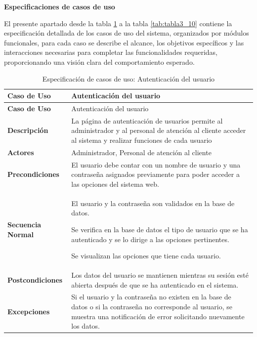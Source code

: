 	\noindent \textbf{Especificaciones de casos de uso}
	
	El presente apartado desde la tabla \ref{tab:tabla3_2} a la tabla \ref{tab:tabla3_10} contiene la especificación detallada de los casos de uso del sistema, organizados por módulos funcionales, para cada caso se describe el alcance, los objetivos específicos y las interacciones necesarias para completar las funcionalidades requeridas, proporcionando una visión clara del comportamiento esperado.
	
	\begingroup
	\onehalfspacing
	
	\begin{longtable}{m{4cm} m{10.5cm}}
		\caption[Especificación de casos de uso: Autenticación del usuario]{\newline Especificación de casos de uso: Autenticación del usuario} \label{tab:tabla3_2}\\
		\toprule
		\textbf{Caso de Uso} & Autenticación del usuario \\
		\midrule
		\endfirsthead
		
		\textbf{Caso de Uso} & Autenticación del usuario \\
		\midrule
		\endhead
		
		
		\bottomrule
		\endlastfoot
		
		\textbf{Descripción} & La página de autenticación de usuarios permite al administrador y al personal de atención al cliente acceder al sistema y realizar funciones de cada usuario \\ \hline
		\textbf{Actores} & Administrador, Personal de atención al cliente \\ \hline
		\textbf{Precondiciones} & El usuario debe contar con un nombre de usuario y una contraseña asignados previamente para poder acceder a las opciones del sistema web. \\ \hline
		\textbf{Secuencia Normal} & 
			El usuario y la contraseña son validados en la base de datos.
			
			Se verifica en la base de datos el tipo de usuario que se ha autenticado y se lo dirige a las opciones pertinentes.
			
			Se visualizan las opciones que tiene cada usuario. \\ \hline
		\textbf{Postcondiciones} & Los datos del usuario se mantienen mientras su sesión esté abierta después de que se ha autenticado en el sistema.\\ \hline
		\textbf{Excepciones} & Si el usuario y la contraseña no existen en la base de datos o si la contraseña no corresponde al usuario, se muestra una notificación de error solicitando nuevamente los datos. \\		
	\end{longtable}
	
